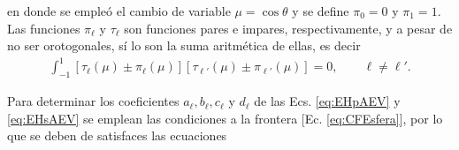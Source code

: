 \noindent en donde se empleó el cambio de variable $\mu = \cos\theta$ y se define   $\pi_0 =0 $ y $\pi_1 = 1$.  Las funciones $\pi_\ell$ y $\tau_\ell$ son funciones pares e impares, respectivamente, y a pesar de no ser orotogonales, sí lo son la suma aritmética de ellas, es decir \cite{bohren1998absorption}
	\begin{align}
	\int_{-1}^{1}[\tau_\ell(\mu)\pm\pi_\ell(\mu)]
	[\tau_{\ell'}(\mu)\pm\pi_{\ell'}(\mu)] = 0, \qquad \ell\neq \ell'. 
	\label{eq:ortTauPi}
	\end{align}

Para determinar los coeficientes $a_\ell,b_\ell,c_\ell$ y $d_\ell$ de las Ecs. \eqref{eq:EHpAEV} y \eqref{eq:EHsAEV} se emplean las condiciones a la frontera [Ec. \eqref{eq:CFEsfera}], por lo que se deben de satisfaces las ecuaciones 

	\vspace*{-1em}

